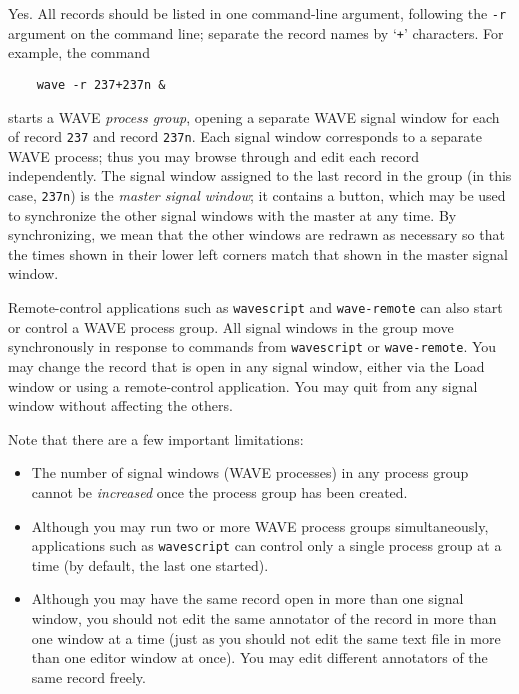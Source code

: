 \documentclass[twoside]{book}
\newcommand{\button}[1]{\cornersize{2}\ovalbox{\rule[-.3mm]{0cm}{2.5mm}\small\sf ~#1~}}
\newcommand{\WAVE}{{\sf WAVE}\xspace}
\begin{document}
\index{r option for WAVE@{\tt -r} option for \WAVE{}}
Yes. All records should be listed in one command-line argument,
following the {\tt -r} argument on the command line;  separate the
record names by `{\tt +}' characters.  For example, the command
\begin{verbatim}
    wave -r 237+237n &
\end{verbatim}
starts a \WAVE{} \emph{process group}, opening a separate \WAVE{} signal
window for each of record {\tt 237} and record {\tt 237n}.  Each signal window
corresponds to a separate \WAVE{} process;  thus you may browse through and
edit each record independently.  The signal window assigned to the last record
in the group (in this case, {\tt 237n}) is the \emph{master signal window};
it contains a \button{Sync} button, which may be used to synchronize the other
signal windows with the master at any time.  By synchronizing, we mean that the
other windows are redrawn as necessary so that the times shown in their lower
left corners match that shown in the master signal window.

Remote-control applications such as {\tt wavescript} and {\tt wave-remote} can
also start or control a \WAVE{} process group.  All signal windows in the
group move synchronously in response to commands from {\tt wavescript} or
{\tt wave-remote}.  You may change the record that is open in any signal
window, either via the {\sf Load} window or using a remote-control application.
You may quit from any signal window without affecting the others.

Note that there are a few important limitations:
\begin{itemize}
\item
The number of signal windows (\WAVE{} processes) in any process group cannot
be \emph{increased} once the process group has been created.  

\item
Although you may run two or more \WAVE{} process groups simultaneously,
applications such as {\tt wavescript} can control only a single process group
at a time (by default, the last one started).

\item
Although you may have the same record open in more than one signal window, you
should not edit the same annotator of the record in more than one window at a
time (just as you should not edit the same text file in more than one editor
window at once).  You may edit different annotators of the same record
freely.
\end{itemize}
\end{document}
